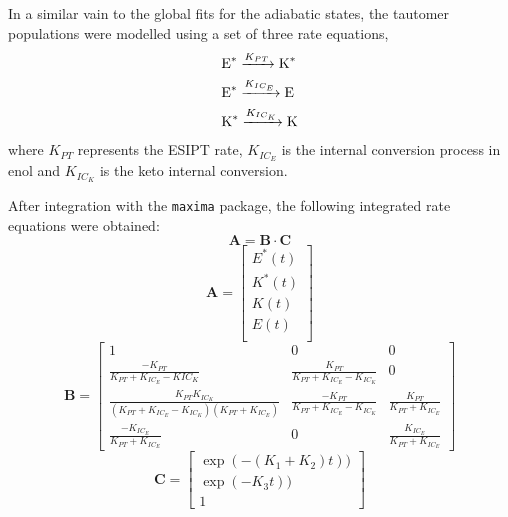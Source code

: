 In a similar vain to the global fits for the adiabatic states, the tautomer populations were modelled using a set of three rate equations, 
\begin{align*}
\centering
\ce{&E^{*} ->[$K_{PT}$] K^{*}\\&E^{*} ->[$K_{IC_E}$] E\\&K^{*} ->[$K_{IC_K}$] K}\\
\end{align*}
where $K_{PT}$ represents the ESIPT rate,  $K_{IC_{E}}$ is the internal conversion process in enol and $K_{IC_{K}}$ is the keto internal conversion. 

After integration with the \texttt{maxima} package, the following integrated rate equations were obtained:
\begin{equation}
\mathbf{A}=\mathbf{B}\cdot\mathbf{C}
\end{equation}
\begin{equation}
\mathbf{A}=
    \begin{bmatrix}
    E^\ast(t)\\
    K^\ast(t)\\
    K(t)\\
    E(t)\\
    \end{bmatrix}
    \end{equation}
\begin{equation}
    \mathbf{B}=
    \begin{bmatrix}
    1 & 0 & 0 \\
    \frac{-K_{PT}}{K_{PT}+K_{IC_E}-K{IC_K}} & \frac{K_{PT}}{K_{PT}+K_{IC_E}-K_{IC_K}} & 0\\
    \frac{K_{PT}K_{IC_K}}{(K_{PT}+K_{IC_E}-K_{IC_K})(K_{PT}+K_{IC_E})} & \frac{-K_{PT}}{K_{PT}+K_{IC_E}-K_{IC_K}} & \frac{K_{PT}}{K_{PT}+K_{IC_E}}\\
    \frac{-K_{IC_E}}{K_{PT}+K_{IC_E}} & 0 & \frac{K_{IC_E}}{K_{PT}+K_{IC_E}}
    \end{bmatrix}
\end{equation}
\begin{equation}
    \mathbf{C}=
    \begin{bmatrix}
    \exp(-(K_{1}+K_{2})t))\\
    \exp(-K_{3}t))\\
    1
    \end{bmatrix}
\end{equation}
